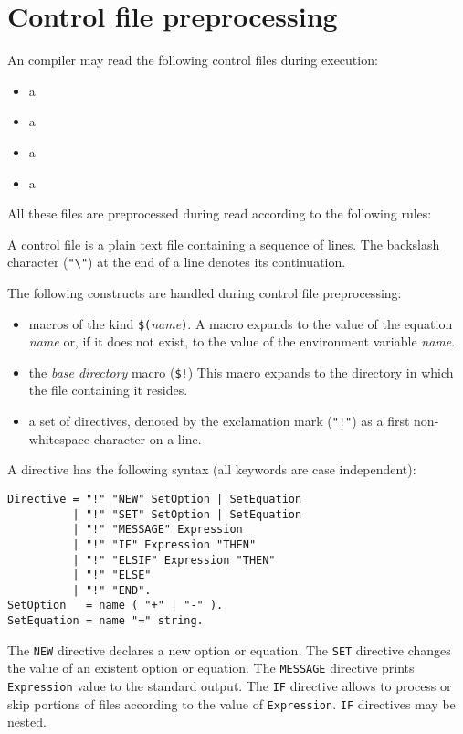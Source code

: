 \section{Control file preprocessing}
\label{usage:cfp}

An \XDS{} compiler may read the following control files during execution:
\begin{itemize}
\item a 
\item a 
\item a 
\item a 
\end{itemize}
All these files are preprocessed during read according to the
following rules:

A control file is a plain text file containing a sequence of lines.
The backslash character (\verb|"\"|) at the end of a line denotes its
continuation.

The following constructs are handled during control file preprocessing:
\begin{itemize}
\item macros of the kind \verb'$('{\it name}\verb')'. A macro expands
      to the value of the equation {\it name} or, if it does not exist,
      to the value of the environment variable {\it name}.
\item the {\em base directory} macro (\verb|$!|) %
      This macro expands to the directory in which the file containing
      it resides.
\item a set of directives, denoted by the exclamation mark (\verb|"!"|)
      as a first non-whitespace character on a line.
\end{itemize}

A directive has the following syntax (all keywords are case independent):
\begin{verbatim}
Directive = "!" "NEW" SetOption | SetEquation
          | "!" "SET" SetOption | SetEquation
          | "!" "MESSAGE" Expression
          | "!" "IF" Expression "THEN"
          | "!" "ELSIF" Expression "THEN"
          | "!" "ELSE"
          | "!" "END".
SetOption   = name ( "+" | "-" ).
SetEquation = name "=" string.
\end{verbatim}

The \verb'NEW' directive declares a new option or equation. The \verb'SET' directive
changes the value of an existent option or equation. The \verb'MESSAGE' directive
prints \verb'Expression' value to the standard output.
The \verb'IF' directive allows to process or skip portions of files according
to the value of \verb'Expression'. \verb'IF' directives may be nested.


